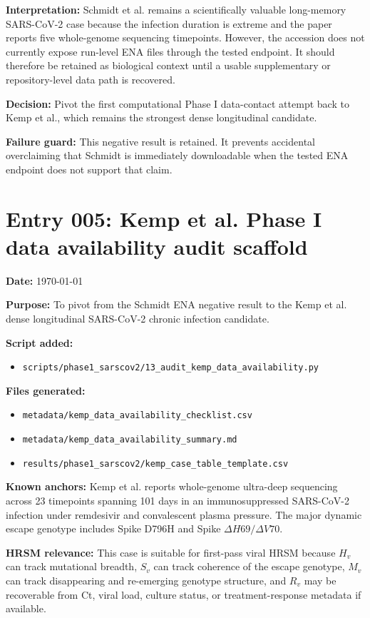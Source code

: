\textbf{Interpretation:} Schmidt et al. remains a scientifically valuable long-memory SARS-CoV-2 case because the infection duration is extreme and the paper reports five whole-genome sequencing timepoints. However, the accession does not currently expose run-level ENA files through the tested endpoint. It should therefore be retained as biological context until a usable supplementary or repository-level data path is recovered.

\textbf{Decision:} Pivot the first computational Phase I data-contact attempt back to Kemp et al., which remains the strongest dense longitudinal candidate.

\textbf{Failure guard:} This negative result is retained. It prevents accidental overclaiming that Schmidt is immediately downloadable when the tested ENA endpoint does not support that claim.


\section*{Entry 005: Kemp et al. Phase I data availability audit scaffold}

\textbf{Date:} \today

\textbf{Purpose:} To pivot from the Schmidt ENA negative result to the Kemp et al. dense longitudinal SARS-CoV-2 chronic infection candidate.

\textbf{Script added:}
\begin{itemize}
    \item \texttt{scripts/phase1\_sarscov2/13\_audit\_kemp\_data\_availability.py}
\end{itemize}

\textbf{Files generated:}
\begin{itemize}
    \item \texttt{metadata/kemp\_data\_availability\_checklist.csv}
    \item \texttt{metadata/kemp\_data\_availability\_summary.md}
    \item \texttt{results/phase1\_sarscov2/kemp\_case\_table\_template.csv}
\end{itemize}

\textbf{Known anchors:} Kemp et al. reports whole-genome ultra-deep sequencing across 23 timepoints spanning 101 days in an immunosuppressed SARS-CoV-2 infection under remdesivir and convalescent plasma pressure. The major dynamic escape genotype includes Spike D796H and Spike \(\Delta H69/\Delta V70\).

\textbf{HRSM relevance:} This case is suitable for first-pass viral HRSM because \(H_v\) can track mutational breadth, \(S_v\) can track coherence of the escape genotype, \(M_v\) can track disappearing and re-emerging genotype structure, and \(R_v\) may be recoverable from Ct, viral load, culture status, or treatment-response metadata if available.

